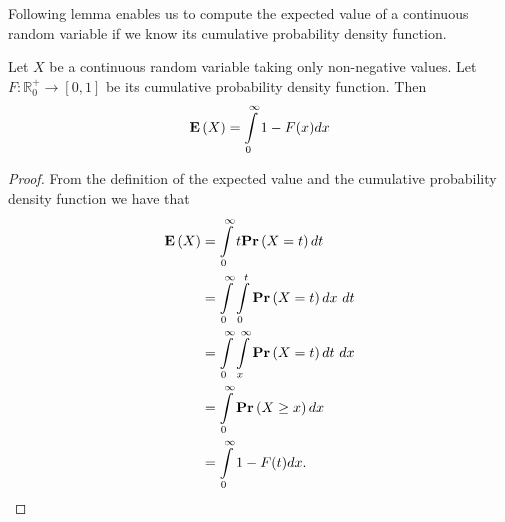 Following lemma enables us to compute the expected value of a continuous random variable if we know its cumulative probability density function.
\begin{lemma}
\label{lemma-expected-value-cumulative}
Let $X$ be a continuous random variable taking only non-negative values. Let $F: \mathbb{R}_{0}^{+} \rightarrow \left[0, 1\right]$ be its cumulative probability density function. Then
\[
	\mathbf{E}\left(X\right) = \int\limits_{0}^{\infty} 1 - F(x) dx
\]
\end{lemma}
\begin{proof}
From the definition of the expected value and the cumulative probability density function we have that
\[
\begin{split}
\mathbf{E}\left(X\right) 
	& = \int\limits_{0}^{\infty} t\mathbf{Pr}\left(X = t\right) dt \\
	& = \int\limits_{0}^{\infty} \int\limits_{0}^{t} \mathbf{Pr}\left(X = t\right) dx \  dt \\
	& = \int\limits_{0}^{\infty} \int\limits_{x}^{\infty} \mathbf{Pr}\left(X = t\right) dt \  dx \\
	& = \int\limits_{0}^{\infty} \mathbf{Pr}\left(X \geq x\right) dx \\
	& = \int\limits_{0}^{\infty} 1 - F(t) dx \text{.}
\end{split}
\]
\end{proof}
